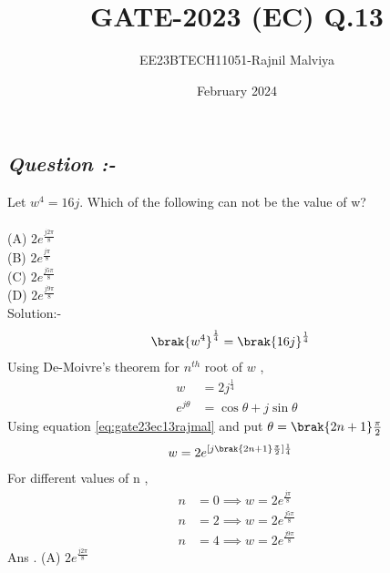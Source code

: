 \documentclass[journal,12pt,twocolumn]{IEEEtran}
\theoremstyle{remark}
\begin{document}
\title{GATE-2023 (EC)  Q.13}
\author{EE23BTECH11051-Rajnil Malviya}
\date{February 2024}
\maketitle
\subsection*{\textit{Question :-}}
Let $ w ^{4} = 16j $. Which of the following can not be the value of w?\\\\
(A)   $2e^\frac{j2 \pi}{8}$\\
(B)   $2e^\frac{j \pi}{8}$\\
(C)   $2e^\frac{j5 \pi}{8}$\\
(D)   $2e^\frac{j9 \pi}{8}$\\
Solution:-
\begin{align}
  \brak{w^4}^{\frac{1}{4}} &= \brak{16 j}^{\frac{1}{4}}
\end{align}
Using De-Moivre's theorem for $n^{th}$ root of $w$ ,
\begin{align}
    w &=  2j^{\frac{1}{4}}\\
    e^{j\theta} &= \cos{\theta}+j\sin{\theta}\label{eq:gate23ec13rajmal}
    \end{align}
    Using equation \eqref{eq:gate23ec13rajmal} and put $\theta =\brak {2n+1} \frac{\pi}{2}$
    \begin{align}
     w &=2e^{ [j \brak {2n+1} \frac{\pi}{2}] \frac{1}{4}}
\end{align}
For different values of n ,
\begin{align}
    n&=0 \implies w =2e^{ \frac{j \pi}{8}}\\
     n&=2 \implies w =2e^{ \frac{j 5\pi}{8}}\\
      n&=4 \implies w =2e^{ \frac{j 9\pi}{8}}
\end{align}
Ans . (A) $2e^\frac{j2 \pi}{8}$
\end{document}
